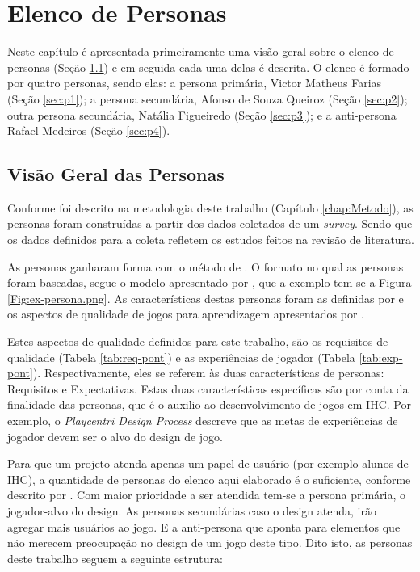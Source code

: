 \chapter{Elenco de Personas}
\label{chap:ele-pers}

Neste capítulo é apresentada primeiramente uma visão geral sobre o elenco de personas (Seção \ref{sec:visao-geral}) e em seguida cada uma delas é descrita. O elenco é formado por quatro personas, sendo elas: a persona primária, Victor Matheus Farias (Seção \ref{sec:p1}); a persona secundária, Afonso de Souza Queiroz (Seção \ref{sec:p2}); outra persona secundária, Natália Figueiredo (Seção \ref{sec:p3}); e a anti-persona Rafael Medeiros (Seção \ref{sec:p4}).

\section{Visão Geral das Personas}
\label{sec:visao-geral}

Conforme foi descrito na metodologia deste trabalho (Capítulo \ref{chap:Metodo}), as personas foram construídas a partir dos dados coletados de um \textit{survey}. Sendo que os dados definidos para a coleta refletem os estudos feitos na revisão de literatura. 

As personas ganharam forma com o método de . O formato no qual as personas foram baseadas, segue o modelo apresentado por , que a exemplo tem-se a Figura \ref{Fig:ex-persona.png}. As características destas personas foram as definidas por  e os aspectos de qualidade de jogos para aprendizagem apresentados por .

Estes aspectos de qualidade definidos para este trabalho, são os requisitos de qualidade (Tabela \ref{tab:req-pont}) e as experiências de jogador (Tabela \ref{tab:exp-pont}). Respectivamente, eles se referem às duas características de personas: Requisitos e Expectativas. Estas duas características específicas são por conta da finalidade das personas, que é o auxilio ao desenvolvimento de jogos em IHC. Por exemplo, o \textit{Playcentri Design Process} \cite{Fullerton_2008} descreve que as metas de experiências de jogador devem ser o alvo do design de jogo.

Para que um projeto atenda apenas um papel de usuário (por exemplo alunos de IHC), a quantidade de personas do elenco aqui elaborado é o suficiente, conforme descrito por . Com maior prioridade a ser atendida tem-se a persona primária, o jogador-alvo do design. As personas secundárias caso o design atenda, irão agregar mais usuários ao jogo. E a anti-persona que aponta para elementos que não merecem preocupação no design de um jogo deste tipo. Dito isto, as personas deste trabalho seguem a seguinte estrutura: 

